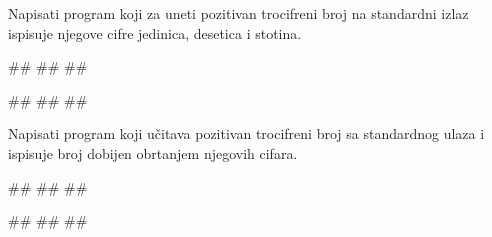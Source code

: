 \begin{Exercise}[label=v1.1_05] 
Napisati program koji za uneti pozitivan trocifreni broj na standardni izlaz ispisuje njegove cifre jedinica, desetica i stotina. 


\begin{miditest}
\begin{upotreba}{1}
#\naslovInt#
##
##
\end{upotreba}
\end{miditest}
\begin{miditest}
\begin{upotreba}{1}
#\naslovInt#
##
##
\end{upotreba}
\end{miditest}
\end{Exercise}
\begin{Answer}[ref=v1.1_05]
\end{Answer}

\begin{Exercise}[label=v1.1_06] 
Napisati program koji učitava pozitivan trocifreni broj sa standardnog ulaza i ispisuje broj dobijen obrtanjem njegovih cifara. 

\begin{miditest}
\begin{upotreba}{1}
#\naslovInt#
##
##
\end{upotreba}
\end{miditest}
\begin{miditest}
\begin{upotreba}{1}
#\naslovInt#
##
##
\end{upotreba}
\end{miditest}





\end{Exercise}
\begin{Answer}[ref=v1.1_06]
\end{Answer}


